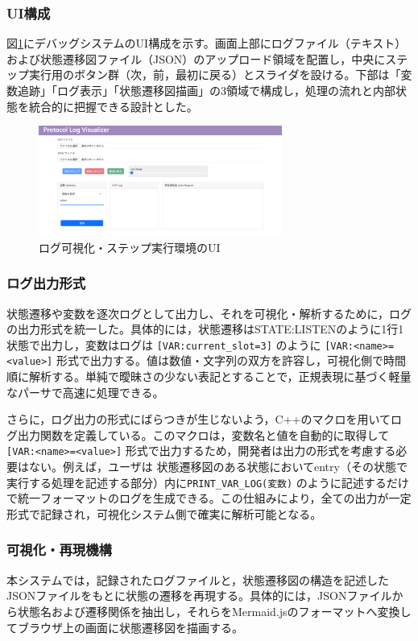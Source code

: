 \documentclass[technicalreport]{ieicej}
\begin{document}
\subsubsection{UI構成}
図\ref{fig:viewer-ui}にデバッグシステムのUI構成を示す。画面上部にログファイル（テキスト）および状態遷移図ファイル（JSON）のアップロード領域を配置し，中央にステップ実行用のボタン群（次，前，最初に戻る）とスライダを設ける。下部は「変数追跡」「ログ表示」「状態遷移図描画」の3領域で構成し，処理の流れと内部状態を統合的に把握できる設計とした。
\begin{figure}[b]
  \centering
  \includegraphics[width=80mm]{./images/viewer_ui.png}
  \caption{ログ可視化・ステップ実行環境のUI}
  \label{fig:viewer-ui}
\end{figure}

\subsubsection{ログ出力形式}
状態遷移や変数を逐次ログとして出力し、それを可視化・解析するために，ログの出力形式を統一した。具体的には，状態遷移はSTATE:LISTENのように1行1状態で出力し，変数はログは \verb|[VAR:current_slot=3]| のように \verb|[VAR:<name>=<value>]| 形式で出力する。値は数値・文字列の双方を許容し，可視化側で時間順に解析する。単純で曖昧さの少ない表記とすることで，正規表現に基づく軽量なパーサで高速に処理できる。

さらに，ログ出力の形式にばらつきが生じないよう，C++のマクロを用いてログ出力関数を定義している。このマクロは，変数名と値を自動的に取得して \verb|[VAR:<name>=<value>]| 形式で出力するため，開発者は出力の形式を考慮する必要はない。例えば，ユーザは 状態遷移図のある状態においてentry（その状態で実行する処理を記述する部分）内に\verb|PRINT_VAR_LOG(変数)| のように記述するだけで統一フォーマットのログを生成できる。この仕組みにより，全ての出力が一定形式で記録され，可視化システム側で確実に解析可能となる。


\subsubsection{可視化・再現機構}
本システムでは，記録されたログファイルと，状態遷移図の構造を記述したJSONファイルをもとに状態の遷移を再現する。具体的には，JSONファイルから状態名および遷移関係を抽出し，それらをMermaid.jsのフォーマットへ変換してブラウザ上の画面に状態遷移図を描画する。
\end{document}
